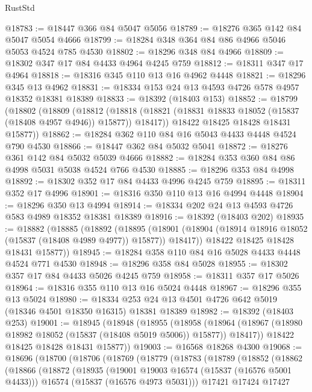 \begin{lexlean}{RustStd}
\begin{coremodule}
@18783 := @18447 @366 @84 @5047 @5056
@18789 := @18276 @365 @142 @84 @5047 @5054 @4666
@18799 := @18284 @348 @364 @84 @86 @4966 @5046 @5053 @4524 @785 @4530
@18802 := @18296 @348 @84 @4966
@18809 := @18302 @347 @17 @84 @4433 @4964 @4245 @759
@18812 := @18311 @347 @17 @4964
@18818 := @18316 @345 @110 @13 @16 @4962 @4448
@18821 := @18296 @345 @13 @4962
@18831 := @18334 @153 @24 @13 @4593 @4726 @578 @4957 @18352 @18381 @18389
@18833 := @18392 (@18403 @153)
@18852 := @18799
    (@18802
      (@18809
        (@18812
          (@18818 (@18821 (@18831 @18833 @18052 (@15837 (@18408 @4957 @4946)) @15877)) @18417))
        @18422
        @18425
        @18428
        @18431
        @15877))
@18862 := @18284 @362 @110 @84 @16 @5043 @4433 @4448 @4524 @790 @4530
@18866 := @18447 @362 @84 @5032 @5041
@18872 := @18276 @361 @142 @84 @5032 @5039 @4666
@18882 := @18284 @353 @360 @84 @86 @4998 @5031 @5038 @4524 @766 @4530
@18885 := @18296 @353 @84 @4998
@18892 := @18302 @352 @17 @84 @4433 @4996 @4245 @759
@18895 := @18311 @352 @17 @4996
@18901 := @18316 @350 @110 @13 @16 @4994 @4448
@18904 := @18296 @350 @13 @4994
@18914 := @18334 @202 @24 @13 @4593 @4726 @583 @4989 @18352 @18381 @18389
@18916 := @18392 (@18403 @202)
@18935 := @18882
    (@18885
      (@18892
        (@18895
          (@18901 (@18904 (@18914 @18916 @18052 (@15837 (@18408 @4989 @4977)) @15877)) @18417))
        @18422
        @18425
        @18428
        @18431
        @15877))
@18945 := @18284 @358 @110 @84 @16 @5028 @4433 @4448 @4524 @771 @4530
@18948 := @18296 @358 @84 @5028
@18955 := @18302 @357 @17 @84 @4433 @5026 @4245 @759
@18958 := @18311 @357 @17 @5026
@18964 := @18316 @355 @110 @13 @16 @5024 @4448
@18967 := @18296 @355 @13 @5024
@18980 := @18334 @253 @24 @13 @4501 @4726 @642 @5019 (@18346 @4501 @18350 @16315) @18381 @18389
@18982 := @18392 (@18403 @253)
@19001 := @18945
    (@18948
      (@18955
        (@18958
          (@18964 (@18967 (@18980 @18982 @18052 (@15837 (@18408 @5019 @5006)) @15877)) @18417))
        @18422
        @18425
        @18428
        @18431
        @15877))
@19003 := @16568 @18268 @4300
@19068 := @18696
    (@18700
      (@18706
        (@18769
          (@18779
            (@18783
              (@18789
                (@18852
                  (@18862
                    (@18866
                      (@18872
                        (@18935
                          (@19001 @19003 @16574 (@15837 (@16576 @5001 @4433)))
                          @16574
                          (@15837 (@16576 @4973 @5031)))
                        @17421
                        @17424
                        @17427

\end{coremodule}
\end{lexlean}
